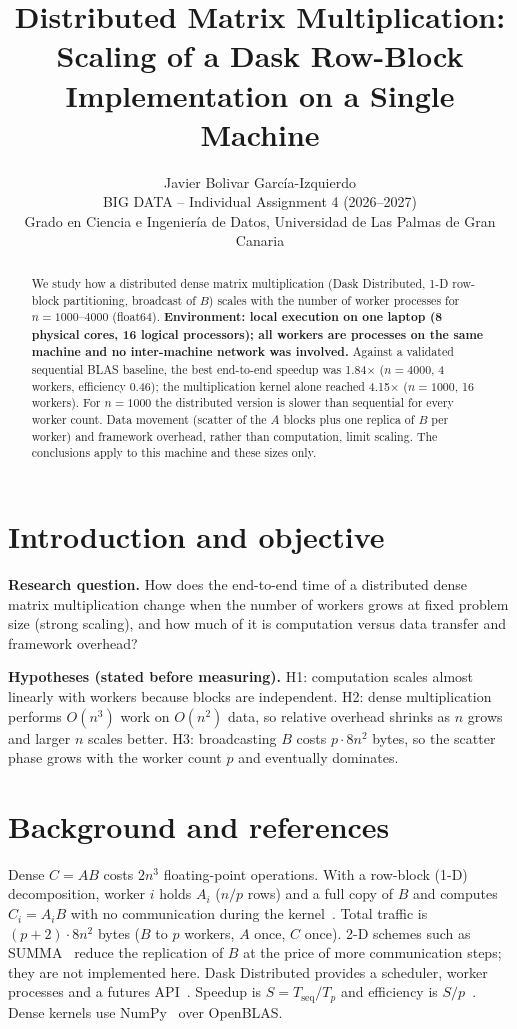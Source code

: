 \documentclass[10pt,a4paper]{article}
\title{Distributed Matrix Multiplication:\\Scaling of a Dask Row-Block Implementation on a Single Machine}
\author{Javier Bolivar Garc\'ia-Izquierdo\\[2pt]\small BIG DATA -- Individual Assignment 4 (2026--2027)\\\small Grado en Ciencia e Ingenier\'ia de Datos, Universidad de Las Palmas de Gran Canaria}
\date{}
\begin{document}
\maketitle

\begin{abstract}
We study how a distributed dense matrix multiplication (Dask Distributed, 1-D row-block partitioning, broadcast of $B$) scales with the number of worker processes for $n=1000$--$4000$ (float64).
\textbf{Environment: local execution on one laptop (8 physical cores, 16 logical processors); all workers are processes on the same machine and no inter-machine network was involved.}
Against a validated sequential BLAS baseline, the best end-to-end speedup was 1.84$\times$ ($n=4000$, 4 workers, efficiency 0.46); the multiplication kernel alone reached 4.15$\times$ ($n=1000$, 16 workers).
For $n=1000$ the distributed version is slower than sequential for every worker count.
Data movement (scatter of the $A$ blocks plus one replica of $B$ per worker) and framework overhead, rather than computation, limit scaling.
The conclusions apply to this machine and these sizes only.
\end{abstract}

\section{Introduction and objective}
\textbf{Research question.} How does the end-to-end time of a distributed dense matrix multiplication change when the number of workers grows at fixed problem size (strong scaling), and how much of it is computation versus data transfer and framework overhead?

\textbf{Hypotheses (stated before measuring).}
H1: computation scales almost linearly with workers because blocks are independent.
H2: dense multiplication performs $O(n^3)$ work on $O(n^2)$ data, so relative overhead shrinks as $n$ grows and larger $n$ scales better.
H3: broadcasting $B$ costs $p\cdot 8n^2$ bytes, so the scatter phase grows with the worker count $p$ and eventually dominates.

\section{Background and references}
Dense $C=AB$ costs $2n^3$ floating-point operations. With a row-block (1-D) decomposition, worker $i$ holds $A_i$ ($n/p$ rows) and a full copy of $B$ and computes $C_i=A_iB$ with no communication during the kernel~\cite{grama}. Total traffic is $(p+2)\cdot 8n^2$ bytes ($B$ to $p$ workers, $A$ once, $C$ once). 2-D schemes such as SUMMA~\cite{summa} reduce the replication of $B$ at the price of more communication steps; they are not implemented here. Dask Distributed provides a scheduler, worker processes and a futures API~\cite{dask}. Speedup is $S=T_\mathrm{seq}/T_p$ and efficiency is $S/p$~\cite{grama}. Dense kernels use NumPy~\cite{numpy} over OpenBLAS.
\end{document}
